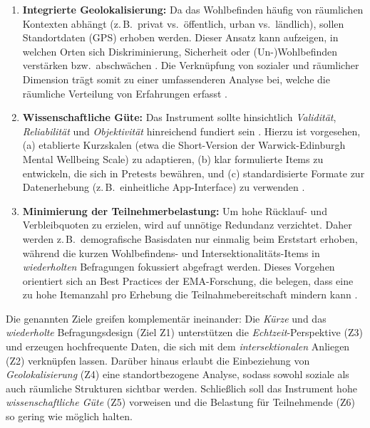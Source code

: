 \begin{enumerate}[label=(Z\arabic*)]
    \item \textbf{Integrierte Geolokalisierung:}
    Da das Wohlbefinden häufig von räumlichen Kontexten abhängt (z.\,B.\ privat vs.\ öffentlich, urban vs.\ ländlich), sollen Standortdaten (GPS) erhoben werden. Dieser Ansatz kann aufzeigen, in welchen Orten sich Diskriminierung, Sicherheit oder (Un-)Wohlbefinden verstärken bzw.\ abschwächen \parencite{rodo-de-zarate_developing_2014}. Die Verknüpfung von sozialer und räumlicher Dimension trägt somit zu einer umfassenderen Analyse bei, welche die räumliche Verteilung von Erfahrungen erfasst \parencite{bakolis_urban_2018}.

    \item \textbf{Wissenschaftliche Güte:}
    Das Instrument sollte hinsichtlich \emph{Validität}, \emph{Reliabilität} und \emph{Objektivität} hinreichend fundiert sein \parencite{dillman_internet_2014}. Hierzu ist vorgesehen, (a) etablierte Kurzskalen (etwa die Short-Version der Warwick-Edinburgh Mental Wellbeing Scale) zu adaptieren, (b) klar formulierte Items zu entwickeln, die sich in Pretests bewähren, und (c) standardisierte Formate zur Datenerhebung (z.\,B.\ einheitliche App-Interface) zu verwenden \parencite{tennant_warwick-edinburgh_2007, krosnick_question_2009}.

    \item \textbf{Minimierung der Teilnehmerbelastung:}
    Um hohe Rücklauf- und Verbleibquoten zu erzielen, wird auf unnötige Redundanz verzichtet. Daher werden z.\,B.\ demografische Basisdaten nur einmalig beim Erststart erhoben, während die kurzen Wohlbefindens- und Intersektionalitäts-Items in \emph{wiederholten} Befragungen fokussiert abgefragt werden. Dieses Vorgehen orientiert sich an Best Practices der EMA-Forschung, die belegen, dass eine zu hohe Itemanzahl pro Erhebung die Teilnahmebereitschaft mindern kann \parencite[vgl.]{shiffman_ecological_2008}.
\end{enumerate}

\noindent
Die genannten Ziele greifen komplementär ineinander: Die \emph{Kürze} und das \emph{wiederholte} Befragungsdesign (Ziel Z1) unterstützen die \emph{Echtzeit}-Perspektive (Z3) und erzeugen hochfrequente Daten, die sich mit dem \emph{intersektionalen} Anliegen (Z2) verknüpfen lassen. Darüber hinaus erlaubt die Einbeziehung von \emph{Geolokalisierung} (Z4) eine standortbezogene Analyse, sodass sowohl soziale als auch räumliche Strukturen sichtbar werden. Schließlich soll das Instrument hohe \emph{wissenschaftliche Güte} (Z5) vorweisen und die Belastung für Teilnehmende (Z6) so gering wie möglich halten.


